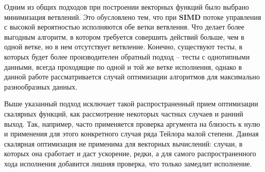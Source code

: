Одним из общих подходов при построении векторных функций было выбрано минимизация ветвлений.
Это обусловлено тем, что при \textbf{SIMD} потоке управления с высокой вероятностью исполняются обе ветки ветвления.
Что делает более выгодным алгоритм, в котором требуется совершить действий больше, чем в одной ветке, но в нем отсутствует ветвление.
Конечно, существуют тесты, в которых будет более производителен обратный подход -- тесты с однотипными данными, всегда проходящие по одной и той же ветке исполнения, однако в данной работе рассматривается случай оптимизации алгоритмов для максимально разнообразных данных.

Выше указанный подход исключает такой распространенный прием оптимизации скалярных функций, как рассмотрение некоторых частных случаев и ранний выход.
Так, например, часто применяется проверка аргумента на близость к нулю и применения для этого конкретного случая ряда Тейлора малой степени.
Данная скалярная оптимизация не применима для векторных вычислений: случаи, в которых она сработает и даст ускорение, редки, а для самого распространенного хода исполнения добавится лишняя проверка, что только замедлит исполнение.

